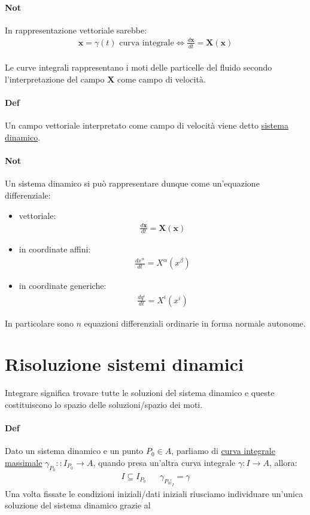 \paragraph*{Not}In rappresentazione vettoriale sarebbe:
\begin{align*}
    \mathbf{x}=\gamma(t) \text{ curva integrale} \iff \frac{d\mathbf{x}}{dt}=\mathbf{X}(\mathbf{x})
\end{align*}\\
Le curve integrali rappresentano i moti delle particelle del fluido secondo l'interpretazione del campo $\mathbf{X}$ come campo di velocità.\\
\paragraph{Def} Un campo vettoriale interpretato come campo di velocità viene detto \underline{sistema dinamico}.
\paragraph{Not} Un sistema dinamico si può rappresentare dunque come un'equazione differenziale:
\begin{itemize}
        \item vettoriale:
        \begin{align*}
            \frac{d\mathbf{x}}{dt}=\mathbf{X}(\mathbf{x})
        \end{align*}
        \item in coordinate affini:
        \begin{align*}
            \frac{dx^\alpha}{dt}=X^\alpha (x^\beta)
        \end{align*}
        \item in coordinate generiche:
        \begin{align*}
            \frac{dq^i}{dt}=X^i (x^i)
        \end{align*}
\end{itemize}
In particolare sono $n$ equazioni differenziali ordinarie in forma normale autonome.
\section{Risoluzione sistemi dinamici} Integrare significa trovare tutte le soluzioni del sistema dinamico e queste costituiscono lo spazio delle soluzioni/spazio dei moti.
\paragraph*{Def}Dato un sistema dinamico e un punto $P_0\in A$, parliamo di \underline{curva integrale massimale} $\gamma_{P_0}\colon: I_{P_0}\to A$, quando presa un'altra curva integrale $\gamma\colon I\to A$, allora:
\begin{align*}
    I \subseteq I_{P_0}&& \gamma_{P_0|_I}=\gamma
\end{align*}
Una volta fissate le condizioni iniziali/dati iniziali riusciamo individuare un'unica soluzione del sistema dinamico grazie al
